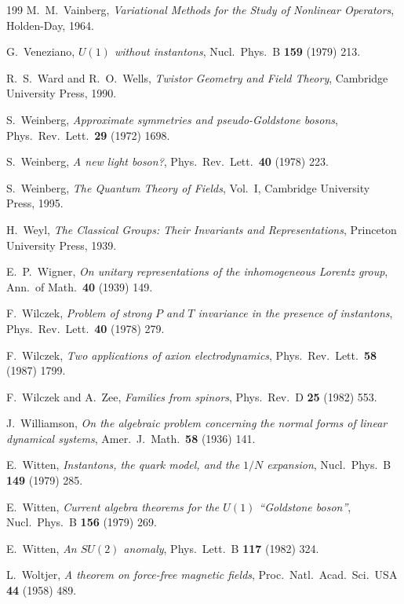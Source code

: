 \begin{thebibliography}{199}
 M.~M.~Vainberg, \emph{Variational Methods for the Study of Nonlinear Operators}, Holden-Day, 1964.

 G.~Veneziano, \emph{$U(1)$ without instantons}, Nucl.~Phys.~B \textbf{159} (1979) 213.

 R.~S.~Ward and R.~O.~Wells, \emph{Twistor Geometry and Field Theory}, Cambridge University Press, 1990.

 S.~Weinberg, \emph{Approximate symmetries and pseudo-Goldstone bosons}, Phys.~Rev.~Lett.~\textbf{29} (1972) 1698.

 S.~Weinberg, \emph{A new light boson?}, Phys.~Rev.~Lett.~\textbf{40} (1978) 223.

 S.~Weinberg, \emph{The Quantum Theory of Fields}, Vol.~I, Cambridge University Press, 1995.

 H.~Weyl, \emph{The Classical Groups: Their Invariants and Representations}, Princeton University Press, 1939.

 E.~P.~Wigner, \emph{On unitary representations of the inhomogeneous Lorentz group}, Ann.~of Math.~\textbf{40} (1939) 149.

 F.~Wilczek, \emph{Problem of strong $P$ and $T$ invariance in the presence of instantons}, Phys.~Rev.~Lett.~\textbf{40} (1978) 279.

 F.~Wilczek, \emph{Two applications of axion electrodynamics}, Phys.~Rev.~Lett.~\textbf{58} (1987) 1799.

 F.~Wilczek and A.~Zee, \emph{Families from spinors}, Phys.~Rev.~D \textbf{25} (1982) 553.

 J.~Williamson, \emph{On the algebraic problem concerning the normal forms of linear dynamical systems}, Amer.~J.~Math.~\textbf{58} (1936) 141.

 E.~Witten, \emph{Instantons, the quark model, and the $1/N$ expansion}, Nucl.~Phys.~B \textbf{149} (1979) 285.

 E.~Witten, \emph{Current algebra theorems for the $U(1)$ ``Goldstone boson''}, Nucl.~Phys.~B \textbf{156} (1979) 269.

 E.~Witten, \emph{An $SU(2)$ anomaly}, Phys.~Lett.~B \textbf{117} (1982) 324.

 L.~Woltjer, \emph{A theorem on force-free magnetic fields}, Proc.~Natl.~Acad.~Sci.~USA \textbf{44} (1958) 489.


\end{thebibliography}
